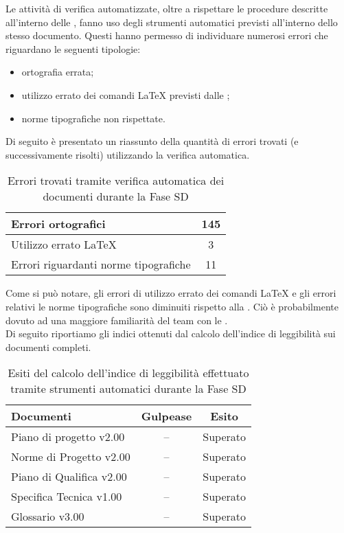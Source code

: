 			Le attività di verifica automatizzate, oltre a rispettare le procedure descritte all'interno delle , fanno uso degli strumenti automatici previsti all'interno dello stesso documento. Questi hanno permesso di individuare numerosi errori che riguardano le seguenti tipologie:
			\begin{itemize}
				\item ortografia errata;
				\item utilizzo errato dei comandi \LaTeX{} previsti dalle ;
				\item norme tipografiche non rispettate.
			\end{itemize}
			Di seguito è presentato un riassunto della quantità di errori trovati (e successivamente risolti) utilizzando la verifica automatica.
			\begin{table}[H]
					\centering
					\begin{tabu}{| l | c |}
						\hline
						Errori ortografici	&145	\\ \hline
						Utilizzo errato \LaTeX{}	&3	\\ \hline
						Errori riguardanti norme tipografiche	&11	\\ \hline
					\end{tabu}
					\caption{Errori trovati tramite verifica automatica dei documenti durante la Fase SD}
				\end{table}
				Come si può notare, gli errori di utilizzo errato dei comandi \LaTeX{} e gli errori relativi le norme tipografiche sono diminuiti rispetto alla . Ciò è probabilmente dovuto ad una maggiore familiarità del team con le \insdoc{Norme di Progetto}.\\
				Di seguito riportiamo gli indici ottenuti dal calcolo dell'indice di leggibilità sui documenti completi.
				\begin{table}[H]
					\centering
					\begin{tabu}{| l | c | c |}
							\hline
							Documenti 							& Gulpease	& Esito		\\ \hline \hline
							
							Piano di progetto v2.00				& -- 		& Superato  \\ \hline
							Norme di Progetto v2.00 			& --		& Superato  \\ \hline
							Piano di Qualifica v2.00 			& --		& Superato  \\ \hline
							Specifica Tecnica v1.00 			& --		& Superato  \\ \hline
							Glossario v3.00					 	& -- 		& Superato  \\ \hline
						\end{tabu}
					\caption{Esiti del calcolo dell'indice di leggibilità effettuato tramite strumenti automatici durante la Fase SD}
				\end{table}
